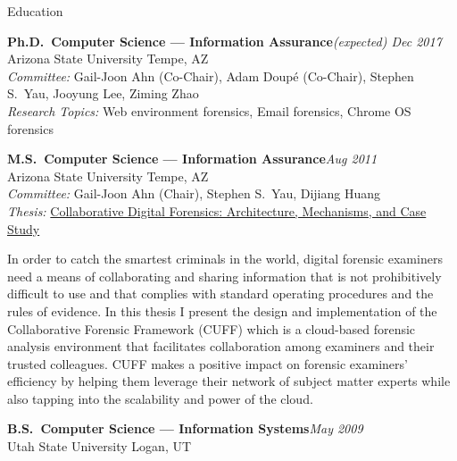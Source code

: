 

\begin{rSection}{Education}

\textbf{Ph.D.\ Computer Science --- Information Assurance}\hfill \emph{(expected) Dec 2017}\\
Arizona State University \hfill {Tempe, AZ}\\
\textit{Committee:} Gail-Joon Ahn (Co-Chair), Adam Doup\'{e} (Co-Chair), Stephen S.\ Yau, Jooyung Lee, Ziming Zhao\\
\textit{Research Topics:} Web environment forensics, Email forensics, Chrome OS forensics

\textbf{M.S.\ Computer Science --- Information Assurance}\hfill \emph{Aug 2011}\\
Arizona State University \hfill {Tempe, AZ}\\
\textit{Committee:} Gail-Joon Ahn (Chair), Stephen S.\ Yau, Dijiang Huang\\
\textit{Thesis:} \href{http://repository.asu.edu/attachments/56996/content/Mabey_asu_0010N_10959.pdf}{Collaborative Digital Forensics: Architecture, Mechanisms, and Case Study}\begin{CVonly}
\begin{quoting}
  In order to catch the smartest criminals in the world, digital forensic examiners need a means of collaborating and sharing information that is not prohibitively difficult to use and that complies with standard operating procedures and the rules of evidence. In this thesis I present the design and implementation of the Collaborative Forensic Framework (CUFF) which is a cloud-based forensic analysis environment that facilitates collaboration among examiners and their trusted colleagues. CUFF makes a positive impact on forensic examiners' efficiency by helping them leverage their network of subject matter experts while also tapping into the scalability and power of the cloud.
\end{quoting}\end{CVonly}

\textbf{B.S.\ Computer Science --- Information Systems}\hfill \emph{May 2009}\\
Utah State University \hfill {Logan, UT}

\end{rSection}
